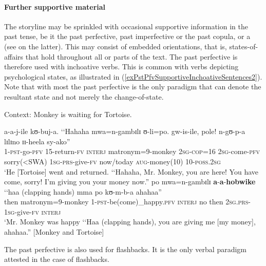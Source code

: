 \paragraph{Further supportive material}
\label{PastPFVNarrativeDiscourseSupportive}
The storyline may be sprinkled with occasional supportive information in the past tense, be it the past perfective, past imperfective or the past copula, or a  (see  on the latter). This may consist of embedded orientations, that is, states-of-affairs that hold throughout all or parts of the text. The past perfective is therefore used with inchoative verbs. This is common with verbs depicting psychological states, as illustrated in (\ref{exPstPfvSupportiveInchoativeSentences2}). Note that with most  the past perfective is the only paradigm that can denote the resultant state and not merely the change-of-state. 

\newpage 
\begin{exe}
\ex Context: Monkey is waiting for Tortoise.

\begin{xlist}
\ex \gll a-a-j-ile kʊ-buj-a. \textup{\lq\lq}Hahaha mwa=n-gambɪlɪ ʊ-li=po. gw-is-ile, pole! n-gʊ-p-a lɪlɪno ɪɪ-heela sy-ako\textup{''}\\
1-\textsc{pst}-go-\textsc{pfv} 15-return-\textsc{fv} \phantom{\lq\lq}\textsc{interj} matronym=9-monkey \textsc{2sg}-\textsc{cop}=16 \textsc{2sg}-come-\textsc{pfv} sorry(<SWA) \textsc{1sg}-\textsc{prs}-give-\textsc{fv} now/today \textsc{aug}-money(10) 10-\textsc{poss.2sg}\\
\glt \lq He [Tortoise] went and returned. \lq\lq Hahaha, Mr. Monkey, you are here! You have come, sorry! I'm giving you your money now.''
\ex \label{exPstPfvSupportiveInchoativeSentences2}
 \gll po mwa=n-gambɪlɪ \textbf{a}-\textbf{a}-\textbf{hobwike} \textup{\lq\lq}haa \textup{(clapping hands)} mma po kʊ-m-b-a ahahaa\textup{''}\\
then matronym=9-monkey 1-\textsc{pst}-be(come)\_happy.\textsc{pfv}
\phantom{\lq\lq}\textsc{interj} {} no then \textsc{2sg.prs}-\textsc{1sg}-give-\textsc{fv} \textsc{interj}\\
\glt \lq Mr. Monkey was happy \lq\lq Haa (clapping hands), you are giving me [my money], ahahaa.'' [Monkey and Tortoise]
\end{xlist}
\end{exe}

The past perfective is also used for flashbacks. It is the only verbal paradigm attested in the case of flashbacks.

